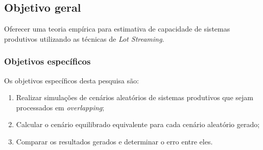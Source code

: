 \subsection{Objetivo geral} \label{subsec:objetivos}
    Oferecer uma teoria empírica para estimativa de capacidade de sistemas produtivos utilizando as técnicas de \textit{Lot Streaming}.
    
    \subsubsection{Objetivos específicos} \label{subsubsec:obespec}
    Os objetivos específicos desta pesquisa são:
        \begin{enumerate}[label=\alph*)]
            \item Realizar simulações de cenários aleatórios de sistemas produtivos que sejam processados em \textit{overlapping};
            \item Calcular o cenário equilibrado equivalente para cada cenário aleatório gerado;
            \item Comparar os resultados gerados e determinar o erro entre eles.
        \end{enumerate}
